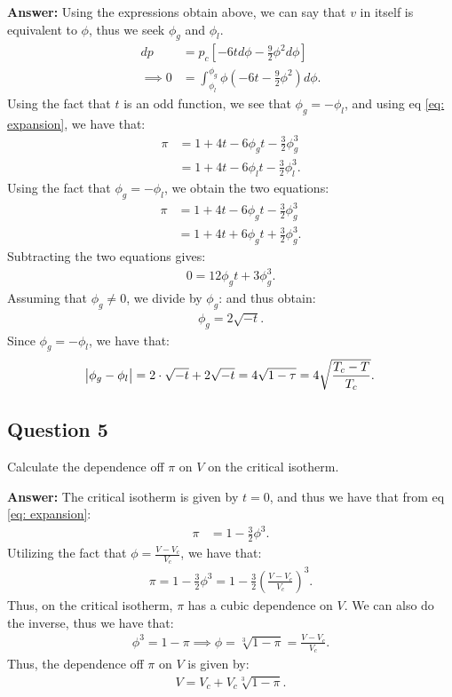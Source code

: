 \documentclass[a4paper]{article}
\newcommand{\newparagraph}{\vspace{.5cm}\noindent}
\begin{document}
\newparagraph
\textbf{Answer: }Using the expressions obtain above, we can say that $v$ in itself is equivalent to $\phi$, thus we seek $\phi_g$ and $\phi_l$.
\begin{align*}
    dp &= p_c\left[-6t d\phi - \frac{9}{2}\phi^2d\phi\right]\\
    \implies 0 &= \int_{\phi_l}^{\phi_g} \phi\left(-6t - \frac{9}{2}\phi^2\right)d\phi.
\end{align*}Using the fact that $t$ is an odd function, we see that $\phi_g = -\phi_l$, and using eq \eqref{eq: expansion}, we have that:
\begin{align*}
    \pi &= 1 + 4t - 6\phi_g t -\frac{3}{2}\phi_g^3\\
    &= 1 + 4t - 6\phi_l t -\frac{3}{2}\phi_l^3.
\end{align*}Using the fact that $\phi_g = -\phi_l$, we obtain the two equations:
\begin{align*}
    \pi &= 1 + 4t - 6\phi_g t -\frac{3}{2}\phi_g^3\\
    &= 1 + 4t + 6\phi_g t +\frac{3}{2}\phi_g^3.
\end{align*}Subtracting the two equations gives:
\begin{align*}
    0 =12 \phi_g t + 3 \phi_g^3.
\end{align*}Assuming that $\phi_g\neq 0$, we divide by $\phi_g$: and thus obtain:
\begin{align*}
    \phi_g = 2\sqrt{-t}.
\end{align*}Since $\phi_g = -\phi_l$, we have that:
\begin{align*}
    \abs{\phi_g - \phi_l} = 2\cdot \sqrt{-t} + 2\sqrt{-t} = 4\sqrt{1 - \tau} = 4\sqrt{\frac{T_c-T}{T_c}}. 
\end{align*}


\subsection*{Question 5}
Calculate the dependence off $\pi$ on $V$ on the critical isotherm.

\newparagraph
\textbf{Answer: }The critical isotherm is given by $t = 0$, and thus we have that from eq \eqref{eq: expansion}:
\begin{align*}
    \pi &= 1 - \frac{3}{2}\phi^3.
\end{align*}Utilizing the fact that $\phi = \frac{V - V_c}{V_c}$, we have that:
\begin{align*}
    \pi  =1  -\frac{3}{2}\phi^3 =1 -\frac{3}{2}\left(\frac{V - V_c}{V_c}\right)^3.
\end{align*}Thus, on the critical isotherm, $\pi$ has a cubic dependence on $V$. We can also do the inverse, thus we have that:
\begin{align*}
    \phi^3 = 1 - \pi \implies \phi = \sqrt[3]{1 - \pi} = \frac{V - V_c}{V_c}.
\end{align*}Thus, the dependence off $\pi$ on $V$ is given by:
\begin{align*}
    V = V_c + V_c\sqrt[3]{1 - \pi}.
\end{align*}
\end{document}
